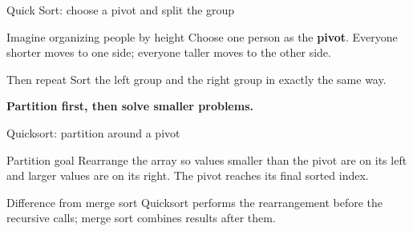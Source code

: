 \documentclass[aspectratio=169]{beamer}
\begin{document}
\begin{frame}{Quick Sort: choose a pivot and split the group}
\small

\begin{block}{Imagine organizing people by height}
Choose one person as the \textbf{pivot}.
Everyone shorter moves to one side;
everyone taller moves to the other side.
\end{block}

\vspace{0.4em}

\begin{center}


\end{center}

\vspace{0.4em}

\begin{exampleblock}{Then repeat}
Sort the left group and the right group in exactly the same way.
\end{exampleblock}

\centering
\Large
\textbf{Partition first, then solve smaller problems.}

\end{frame}

\begin{frame}{Quicksort: partition around a pivot}
  \begin{block}{Partition goal}
    Rearrange the array so values smaller than the pivot are on its left and
    larger values are on its right. The pivot reaches its final sorted index.
  \end{block}
  \begin{center}
  \end{center}
  \begin{alertblock}{Difference from merge sort}
    Quicksort performs the rearrangement before the recursive calls; merge sort
    combines results after them.
  \end{alertblock}
\end{frame}
\end{document}
